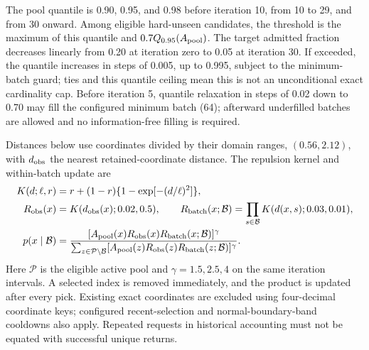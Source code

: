 The pool quantile is 0.90, 0.95, and 0.98 before iteration 10, from 10 to 29, and from 30 onward. Among eligible hard-unseen candidates, the threshold is the maximum of this quantile and $0.7Q_{0.95}(A_{\rm pool})$. The target admitted fraction decreases linearly from 0.20 at iteration zero to 0.05 at iteration 30. If exceeded, the quantile increases in steps of 0.005, up to 0.995, subject to the minimum-batch guard; ties and this quantile ceiling mean this is not an unconditional exact cardinality cap. Before iteration 5, quantile relaxation in steps of 0.02 down to 0.70 may fill the configured minimum batch (64); afterward underfilled batches are allowed and no information-free filling is required.

Distances below use coordinates divided by their domain ranges, $(0.56,2.12)$, with $d_{\rm obs}$ the nearest retained-coordinate distance. The repulsion kernel and within-batch update are
\begin{align}
K(d;\ell,r)&=r+(1-r)\{1-\exp[-(d/\ell)^2]\},\label{eq:kernel}\\
R_{\rm obs}(x)&=K(d_{\rm obs}(x);0.02,0.5),\qquad
R_{\rm batch}(x;\mathcal B)=\prod_{s\in\mathcal B}K(d(x,s);0.03,0.01),\label{eq:repulsion}\\
p(x\mid\mathcal B)&=\frac{[A_{\rm pool}(x)R_{\rm obs}(x)R_{\rm batch}(x;\mathcal B)]^\gamma}
{\sum_{z\in\mathcal P\setminus\mathcal B}[A_{\rm pool}(z)R_{\rm obs}(z)R_{\rm batch}(z;\mathcal B)]^\gamma}.\label{eq:batchprob}
\end{align}
Here $\mathcal P$ is the eligible active pool and $\gamma=1.5,2.5,4$ on the same iteration intervals. A selected index is removed immediately, and the product is updated after every pick. Existing exact coordinates are excluded using four-decimal coordinate keys; configured recent-selection and normal-boundary-band cooldowns also apply. Repeated requests in historical accounting must not be equated with successful unique returns.

